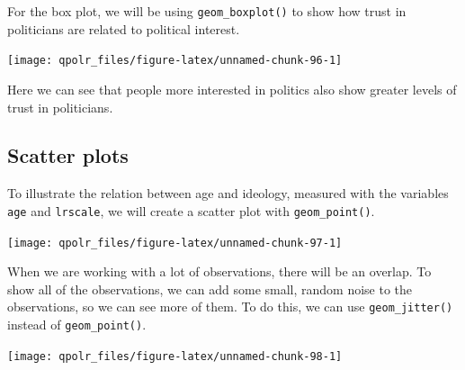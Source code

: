 \documentclass[12pt,oneside]{reedthesis}
\theoremstyle{definition}
\theoremstyle{definition}
\theoremstyle{definition}
\theoremstyle{remark}
\begin{document}
  For the box plot, we will be using \texttt{geom\_boxplot()} to show how
  trust in politicians are related to political interest.
  \begin{Shaded}
  \begin{Highlighting}[]
  \NormalTok{(}\OperatorTok{+}
  \StringTok{  }\NormalTok{() }
  \end{Highlighting}
  \end{Shaded}
  \begin{center}\texttt{[image: qpolr\_files/figure-latex/unnamed-chunk-96-1]} \end{center}
  
  Here we can see that people more interested in politics also show
  greater levels of trust in politicians.
  
  \subsection{Scatter plots}\label{scatter-plots}
  
  To illustrate the relation between age and ideology, measured with the
  variables \texttt{age} and \texttt{lrscale}, we will create a scatter
  plot with \texttt{geom\_point()}.
  \begin{Shaded}
  \begin{Highlighting}[]
  \NormalTok{(}\OperatorTok{+}
  \StringTok{  }\NormalTok{() }
  \end{Highlighting}
  \end{Shaded}
  \begin{center}\texttt{[image: qpolr\_files/figure-latex/unnamed-chunk-97-1]} \end{center}
  
  When we are working with a lot of observations, there will be an
  overlap. To show all of the observations, we can add some small, random
  noise to the observations, so we can see more of them. To do this, we
  can use \texttt{geom\_jitter()} instead of \texttt{geom\_point()}.
  \begin{Shaded}
  \begin{Highlighting}[]
  \NormalTok{(}\OperatorTok{+}
  \StringTok{  }\NormalTok{() }
  \end{Highlighting}
  \end{Shaded}
  \begin{center}\texttt{[image: qpolr\_files/figure-latex/unnamed-chunk-98-1]} \end{center}
  
\end{document}
